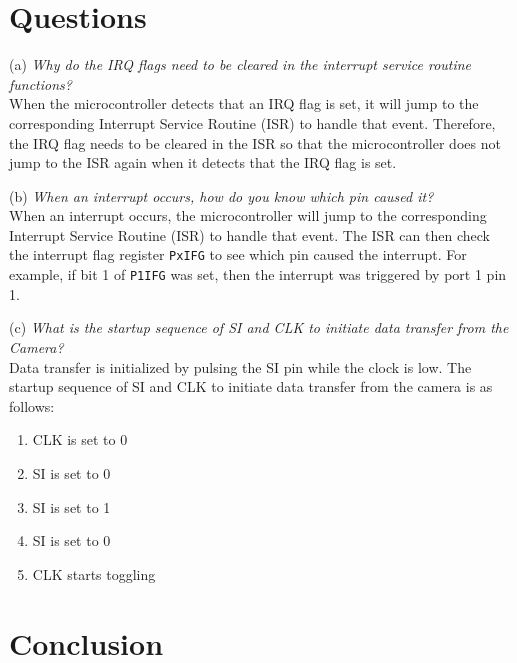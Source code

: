 \documentclass[CMPE]{KGCOEReport}
\begin{document}
\section*{Questions}

(a) \emph{Why do the IRQ flags need to be cleared in the interrupt service routine functions?}\\

When the microcontroller detects that an IRQ flag is set, it will jump to the corresponding Interrupt Service Routine (ISR) to handle that event. Therefore, the IRQ flag needs to be cleared in the ISR so that the microcontroller does not jump to the ISR again when it detects that the IRQ flag is set.
\bigskip

(b) \emph{When an interrupt occurs, how do you know which pin caused it?}\\

When an interrupt occurs, the microcontroller will jump to the corresponding Interrupt Service Routine (ISR) to handle that event. The ISR can then check the interrupt flag register \verb|PxIFG| to see which pin caused the interrupt. For example, if bit 1 of \verb|P1IFG| was set, then the interrupt was triggered by port 1 pin 1.
\bigskip

(c) \emph{What is the startup sequence of SI and CLK to initiate data transfer from the Camera?}\\

Data transfer is initialized by pulsing the SI pin while the clock is low. The startup sequence of SI and CLK to initiate data transfer from the camera is as follows:

\begin{enumerate}
    \item CLK is set to 0
    \item SI is set to 0
    \item SI is set to 1
    \item SI is set to 0
    \item CLK starts toggling
\end{enumerate}

\section*{Conclusion}
\end{document}
